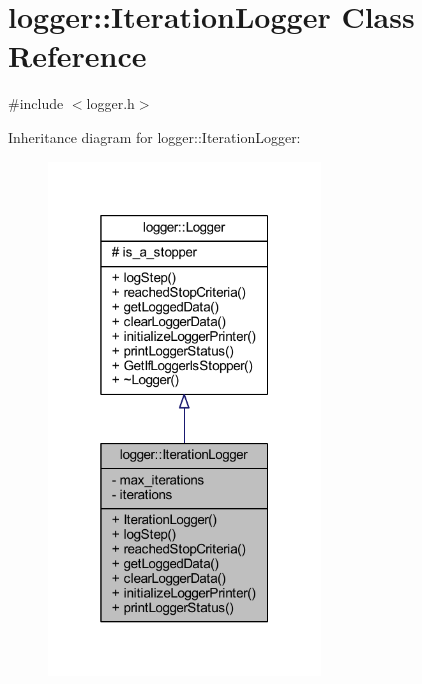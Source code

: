 \hypertarget{classlogger_1_1_iteration_logger}{}\section{logger\+:\+:Iteration\+Logger Class Reference}
\label{classlogger_1_1_iteration_logger}


{\ttfamily \#include $<$logger.\+h$>$}



Inheritance diagram for logger\+:\+:Iteration\+Logger\+:\nopagebreak
\begin{figure}[H]
\begin{center}
\leavevmode
\includegraphics[width=205pt]{classlogger_1_1_iteration_logger__inherit__graph}
\end{center}
\end{figure}


